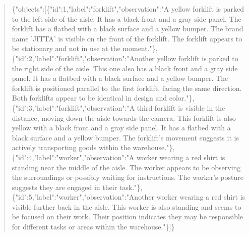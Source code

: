 \documentclass[10pt,a4paper]{article}
\begin{document}
\begin{quote}
\{"objects":\allowbreak{}[\{"id":\allowbreak{}1,\allowbreak{}"label":\allowbreak{}"for\allowbreak{}klift",\allowbreak{}"observation":\allowbreak{}"A yellow forklift is parked to the left side of the aisle. It has a black front and a gray side panel. The forklift has a flatbed with a black surface and a yellow bumper. The brand name 'JITTA' is visible on the front of the forklift. The forklift appears to be stationary and not in use at the moment."\},\allowbreak{}\{"id":\allowbreak{}2,\allowbreak{}"label":\allowbreak{}"forkl\allowbreak{}ift",\allowbreak{}"observation":\allowbreak{}"Another yellow forklift is parked to the right side of the aisle. This one also has a black front and a gray side panel. It has a flatbed with a black surface and a yellow bumper. The forklift is positioned parallel to the first forklift,\allowbreak{} facing the same direction. Both forklifts appear to be identical in design and color."\},\allowbreak{}\{"id":\allowbreak{}3,\allowbreak{}"label":\allowbreak{}"forkli\allowbreak{}ft",\allowbreak{}"observation":\allowbreak{}"A third forklift is visible in the distance,\allowbreak{} moving down the aisle towards the camera. This forklift is also yellow with a black front and a gray side panel. It has a flatbed with a black surface and a yellow bumper. The forklift's movement suggests it is actively transporting goods within the warehouse."\},\allowbreak{}\{"id":\allowbreak{}4,\allowbreak{}"label":\allowbreak{}"wo\allowbreak{}rker",\allowbreak{}"observation":\allowbreak{}"A worker wearing a red shirt is standing near the middle of the aisle. The worker appears to be observing the surroundings or possibly waiting for instructions. The worker's posture suggests they are engaged in their task."\},\allowbreak{}\{"id":\allowbreak{}5,\allowbreak{}"label":\allowbreak{}"worker"\allowbreak{},\allowbreak{}"observation":\allowbreak{}"Another worker wearing a red shirt is visible further back in the aisle. This worker is also standing and seems to be focused on their work. Their position indicates they may be responsible for different tasks or areas within the warehouse."\}]\}
\end{quote}
\end{document}

